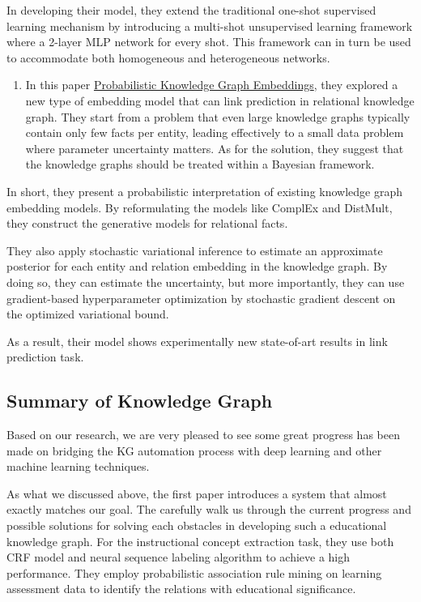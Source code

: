 \documentclass[]{book}
\providecommand{\tightlist}{%
  \setlength{\itemsep}{0pt}\setlength{\parskip}{0pt}}
\theoremstyle{definition}
\theoremstyle{definition}
\theoremstyle{definition}
\theoremstyle{remark}
\begin{document}
In developing their model, they extend the traditional one-shot
supervised learning mechanism by introducing a multi-shot unsupervised
learning framework where a 2-layer MLP network for every shot. This
framework can in turn be used to accommodate both homogeneous and
heterogeneous networks.

\begin{enumerate}
\def\labelenumi{\arabic{enumi}.}
\setcounter{enumi}{2}
\tightlist
\item
  In this paper
  \href{https://openreview.net/pdf?id=rJ4qXnCqFX}{Probabilistic
  Knowledge Graph Embeddings}, they explored a new type of embedding
  model that can link prediction in relational knowledge graph. They
  start from a problem that even large knowledge graphs typically
  contain only few facts per entity, leading effectively to a small data
  problem where parameter uncertainty matters. As for the solution, they
  suggest that the knowledge graphs should be treated within a Bayesian
  framework.
\end{enumerate}

In short, they present a probabilistic interpretation of existing
knowledge graph embedding models. By reformulating the models like
ComplEx and DistMult, they construct the generative models for
relational facts.

They also apply stochastic variational inference to estimate an
approximate posterior for each entity and relation embedding in the
knowledge graph. By doing so, they can estimate the uncertainty, but
more importantly, they can use gradient-based hyperparameter
optimization by stochastic gradient descent on the optimized variational
bound.

As a result, their model shows experimentally new state-of-art results
in link prediction task.

\subsection{Summary of Knowledge
Graph}\label{summary-of-knowledge-graph}

Based on our research, we are very pleased to see some great progress
has been made on bridging the KG automation process with deep learning
and other machine learning techniques.

As what we discussed above, the first paper introduces a system that
almost exactly matches our goal. The carefully walk us through the
current progress and possible solutions for solving each obstacles in
developing such a educational knowledge graph. For the instructional
concept extraction task, they use both CRF model and neural sequence
labeling algorithm to achieve a high performance. They employ
probabilistic association rule mining on learning assessment data to
identify the relations with educational significance.
\end{document}
